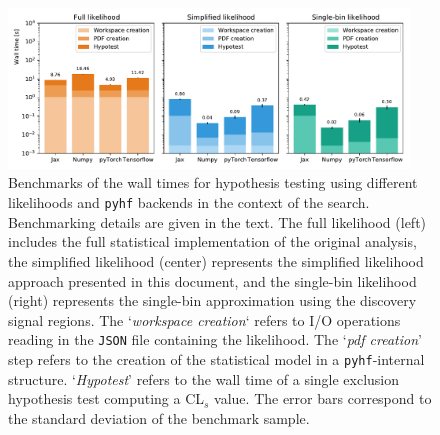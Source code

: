 \begin{figure}
	\centering    
	\includegraphics[width=0.95\textwidth]{benchmark_1Lbb}
	\caption{Benchmarks of the wall times for hypothesis testing using different likelihoods and \texttt{pyhf} backends in the context of the \onelepton search. Benchmarking details are given in the text. The full likelihood (left) includes the full statistical implementation of the original analysis, the simplified likelihood (center) represents the simplified likelihood approach presented in this document, and the single-bin likelihood (right) represents the single-bin approximation using the discovery signal regions. The `\textit{workspace creation}` refers to I/O operations reading in the \texttt{JSON} file containing the likelihood. The `\textit{pdf creation}' step refers to the creation of the statistical model in a \texttt{pyhf}-internal structure. `\textit{Hypotest}' refers to the wall time of a single exclusion hypothesis test computing a CL$_s$ value. The error bars correspond to the standard deviation of the benchmark sample.}\label{fig:benchmark}
	\label{fig:benchmark_1Lbb}
\end{figure}

